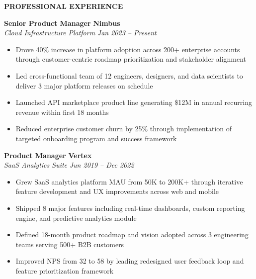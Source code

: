 \documentclass[11pt,letterpaper]{article}
\newcommand{\cvsection}[1]{%
  \begin{sectionbox}
    {\Large\bfseries\color{primary}\MakeUppercase{#1}}
  \end{sectionbox}
}
\begin{document}
\vspace{2pt}

\cvsection{Professional Experience}

\noindent
\textbf{Senior Product Manager} \hfill \textbf{Nimbus}\\[1pt]
\textit{Cloud Infrastructure Platform} \hfill \textit{Jan 2023 -- Present}\\[5pt]
\begin{itemize}
  \item Drove 40\% increase in platform adoption across 200+ enterprise accounts through customer-centric roadmap prioritization and stakeholder alignment
  \item Led cross-functional team of 12 engineers, designers, and data scientists to deliver 3 major platform releases on schedule
  \item Launched API marketplace product line generating \$12M in annual recurring revenue within first 18 months
  \item Reduced enterprise customer churn by 25\% through implementation of targeted onboarding program and success framework
\end{itemize}

\vspace{2pt}
\noindent
\textbf{Product Manager} \hfill \textbf{Vertex}\\[1pt]
\textit{SaaS Analytics Suite} \hfill \textit{Jun 2019 -- Dec 2022}\\[5pt]
\begin{itemize}
  \item Grew SaaS analytics platform MAU from 50K to 200K+ through iterative feature development and UX improvements across web and mobile
  \item Shipped 8 major features including real-time dashboards, custom reporting engine, and predictive analytics module
  \item Defined 18-month product roadmap and vision adopted across 3 engineering teams serving 500+ B2B customers
  \item Improved NPS from 32 to 58 by leading redesigned user feedback loop and feature prioritization framework
\end{itemize}
\end{document}
